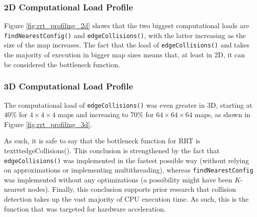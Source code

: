     \subsubsection{2D Computational Load Profile}
        Figure \ref{fig:rrt_profiling_2d} shows that the two biggest computational loads are \texttt{findNearestConfig()} and \texttt{edgeCollisions()}, with the latter increasing as the size of the map increases. The fact that the load of \texttt{edgeCollisions()} and takes the majority of execution in bigger map sizes means that, at least in 2D, it can be considered the bottleneck function.

        

    \subsubsection{3D Computational Load Profile}
        The computational load of \texttt{edgeCollisions()} was even greater in 3D, starting at 40\% for $4\times 4\times 4$ maps and increasing to 70\% for $64\times 64\times 64$ maps, as shown in Figure \ref{fig:rrt_profiling_3d}.

        

        As such, it is safe to say that the bottleneck function for \gls{RRT} is texttt{edgeCollisions()}. This conclusion is strengthened by the fact that \texttt{edgeCollisions()} was implemented in the fastest possible way (without relying on approximations or implementing multithreading), whereas \texttt{findNearestConfig} was implemented without any optimizations (a possibility might have been $K$-nearest nodes). Finally, this conclusion supports prior research that collision detection takes up the vast majority of CPU execution time. As such, this is the function that was targeted for hardware acceleration.  
